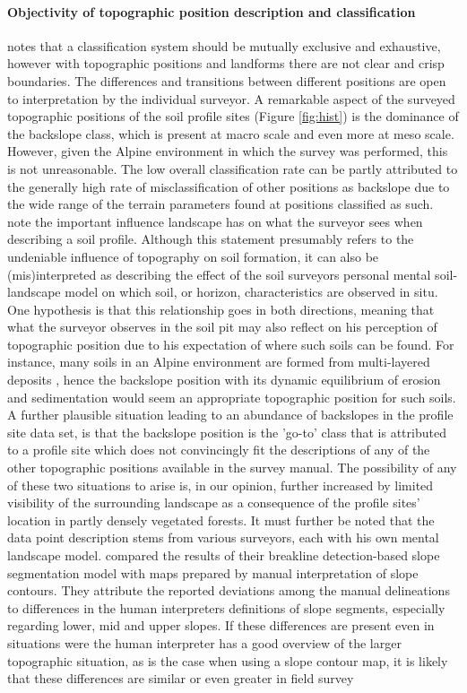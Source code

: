 \documentclass[preprint,12pt,authoryear]{elsarticle}
\begin{document}
\paragraph{Objectivity of topographic position description and classification}
\cite{Congalton1991} notes that a classification system should be mutually exclusive and exhaustive, however with topographic positions and landforms there are not clear and crisp boundaries. The differences and transitions between different positions are open to interpretation by the individual surveyor. A remarkable aspect of the surveyed topographic positions of the soil profile sites (Figure \ref{fig:hist}) is the dominance of the backslope class, which is present at macro scale and even more at meso scale. However, given the Alpine environment in which the survey was performed, this is not unreasonable. The low overall classification rate can be partly attributed to the generally high rate of misclassification of other positions as backslope due to the wide range of the terrain parameters found at positions classified as such. \cite{Brevik2015} note the important influence landscape has on what the surveyor sees when describing a soil profile. Although this statement presumably refers to the undeniable influence of topography on soil formation, it can also be (mis)interpreted as describing the effect of the soil surveyors personal mental soil-landscape model on which soil, or horizon, characteristics are observed in situ. One hypothesis is that this relationship goes in both directions, meaning that what the surveyor observes in the soil pit may also reflect on his perception of topographic position due to his expectation of where such soils can be found. For instance, many soils in an Alpine environment are formed from multi-layered deposits \citep{Baruck2015,Geitner2011a}, hence the backslope position with its dynamic equilibrium of erosion and sedimentation would seem an appropriate topographic position for such soils. A further plausible situation leading to an abundance of backslopes in the profile site data set, is that the backslope position is the 'go-to' class that is attributed to a profile site which does not convincingly fit the descriptions of any of the other topographic positions available in the survey manual. The possibility of any of these two situations to arise is, in our opinion, further increased by limited visibility of the surrounding landscape as a consequence of the profile sites' location in partly densely vegetated forests. It must further be noted that the data point description stems from various surveyors, each with his own mental landscape model. \cite{Matsuura2012} compared the results of their breakline detection-based slope segmentation model with maps prepared by manual interpretation of slope contours. They attribute the reported deviations among the manual delineations to differences in the human interpreters definitions of slope segments, especially regarding lower, mid and upper slopes. If these differences are present even in situations were the human interpreter has a good overview of the larger topographic situation, as is the case when using a slope contour map, it is likely that these differences are similar or even greater in field survey 
\end{document}
